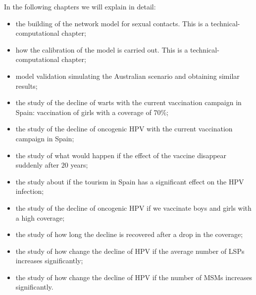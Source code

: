 In the following chapters we will explain in detail: 
\begin{itemize}
	\item the building of the network model for sexual contacts. This is a technical-computational chapter;
	\item how the calibration of the model is carried out. This is a technical-computational chapter;
	\item model validation simulating the Australian scenario and obtaining similar results;
	\item the study of the decline of warts with the current vaccination campaign in Spain: vaccination of girls with a coverage of $70\%$;
	\item the study of the decline of oncogenic HPV with the current vaccination campaign in Spain;
	\item the study of what would happen if the effect of the vaccine disappear suddenly after $20$ years;
	\item the study about if the tourism in Spain has a significant effect on the HPV infection;
	\item the study of the decline of oncogenic HPV if we vaccinate boys and girls with a high coverage;
	\item the study of how long the decline is recovered after a drop in the coverage;
	\item the study of how change the decline of HPV if the average number of LSPs increases significantly;
	\item the study of how change the decline of HPV if the number of MSMs increases significantly.
\end{itemize}


